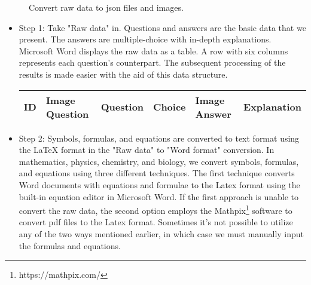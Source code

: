 \documentclass{article}
\begin{document}
{	\begin{figure}[ht!]
		\begin{center}
		\end{center}
		\caption{Convert raw data to json files and images.}
		\label{fig:raw_json}
	\end{figure}
	
	\begin{itemize}
		\item Step 1: Take "Raw data" in. Questions and answers are the basic data that we present. The answers are multiple-choice with in-depth explanations. Microsoft Word displays the raw data as a table. A row with six columns represents each question's counterpart. The subsequent processing of the results is made easier with the aid of this data structure.
		
		\begingroup
\renewcommand{\arraystretch}{1.25} \begin{tabular}{|l|l|l|l|l|l|}
			\hline
			ID & Image Question & Question   & Choice & Image Answer & Explanation           \\ \hline
		\end{tabular}
		\endgroup
		
		\item Step 2: Symbols, formulas, and equations are converted to text format using the LaTeX format in the "Raw data" to "Word format" conversion. In mathematics, physics, chemistry, and biology, we convert symbols, formulas, and equations using three different techniques. The first technique converts Word documents with equations and formulae to the Latex format using the built-in equation editor in Microsoft Word. If the first approach is unable to convert the raw data, the second option employs the Mathpix\footnote{https://mathpix.com/} software to convert pdf files to the Latex format. Sometimes it's not possible to utilize any of the two ways mentioned earlier, in which case we must manually input the formulas and equations.
		

\end{itemize}}
\end{document}
